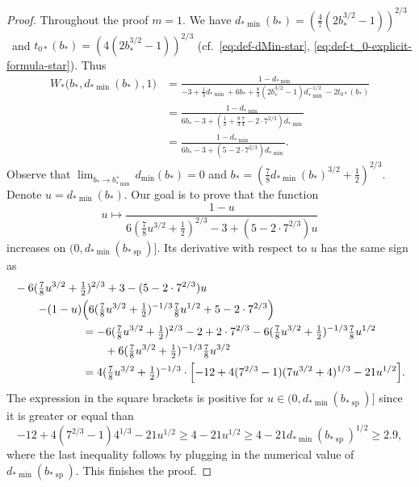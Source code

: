 \documentclass[a4paper]{amsart} %
\theoremstyle{definition}
\theoremstyle{remark}
\numberwithin{equation}{section}
\newcommand*{\bStar}{b_*}
\newcommand*{\tZeroStar}{t_{0*}}
\newcommand*{\XXXspecialbdStar}{W_*}
\newcommand*{\dMin}{d_{\min}}
\newcommand*{\bMinStar}{b_{*\!\min}}
\newcommand*{\dMinStar}{d_{*\!\min}}
\newcommand*{\bShStar}{b_{*\!\operatorname{sp}}}
\begin{document}
\begin{proof}
	Throughout the proof $m=1$.
	We have $\dMinStar(\bStar) = (\frac{4}{7}(2\bStar^{3/2} - 1))^{2/3}$ \
	and
	$\tZeroStar(\bStar) = (4(2\bStar^{3/2} - 1))^{2/3}$ (cf.\ \eqref{eq:def-dMin-star}, \eqref{eq:def-t_0-explicit-formula-star}).
	Thus
	\begin{align*}
	\XXXspecialbdStar\bigl(\bStar, \dMinStar(\bStar), 1\bigr)
	&=
	\frac{1-\dMinStar}{- 3  + \frac{1}{3}\dMinStar + 6 \bStar +
		\frac{8}{3}(2\bStar^{3/2}  -1)\dMinStar^{-1/2} 
		- 2\tZeroStar(\bStar)}\\
	&=\frac{1-\dMinStar}{6 \bStar - 3 + (\frac{1}{3} + \frac{8}{3}\frac{7}{4} -2 \cdot 7^{2/3})\dMinStar}\\
	&= \frac{1-\dMinStar}{6 \bStar - 3 + (5 -2 \cdot 7^{2/3})\dMinStar}.
	\end{align*}
	Observe that $\lim_{\bStar\to \bMinStar^+}\dMin(\bStar) = 0$
	and $\bStar = (\frac{7}{8}\dMinStar(\bStar)^{3/2} + \frac{1}{2})^{2/3}$.
	Denote $u = \dMinStar(\bStar)$. Our goal is to prove that
	the function 
	\[
	u\mapsto \frac{1-u}{6 (\frac{7}{8}u^{3/2} + \frac{1}{2})^{2/3} - 3 + (5 -2 \cdot 7^{2/3})u}
	\]
	increases on $(0, \dMinStar(\bShStar)]$.
	Its derivative with respect to $u$ has the same sign as
	\begin{align*}
	\MoveEqLeft[6]
	-6 (\tfrac{7}{8}u^{3/2} + \tfrac{1}{2})^{2/3} + 3 - (5 -2 \cdot 7^{2/3})u\\
	\qquad 
	-(1-u)&\Bigl(6 (\tfrac{7}{8}u^{3/2} + \tfrac{1}{2})^{-1/3}\tfrac{7}{8} u^{1/2} + 5 -2 \cdot 7^{2/3}\Bigr)\\
	&=
	-6 (\tfrac{7}{8}u^{3/2} + \tfrac{1}{2})^{2/3}  - 2 + 2 \cdot 7^{2/3}
	-6 (\tfrac{7}{8}u^{3/2} + \tfrac{1}{2})^{-1/3}\tfrac{7}{8} u^{1/2} \\
	& \qquad +6 (\tfrac{7}{8}u^{3/2} + \tfrac{1}{2})^{-1/3}\tfrac{7}{8} u^{3/2} \\
	&=4(\tfrac{7}{8}u^{3/2} + \tfrac{1}{2})^{-1/3}
	\cdot \Bigl[ - 12 + 4(7^{2/3} -1)(7u^{3/2} + 4)^{1/3} -21 u^{1/2}\Bigr].
	\end{align*}
	The expression in the square brackets is positive for $u\in(0,\dMinStar(\bShStar)]$ since it is greater or equal than
	\begin{equation*}
	- 12 + 4(7^{2/3} -1)4^{1/3} -21 u^{1/2}
	\geq 4 - 21 u^{1/2} \geq 4 -21 \dMinStar(\bShStar)^{1/2}
	\geq 2.9,
	\end{equation*}
	where the last inequality follows by plugging in the numerical value of $\dMinStar(\bShStar)$.
	This finishes the proof.
\end{proof}
\end{document}
